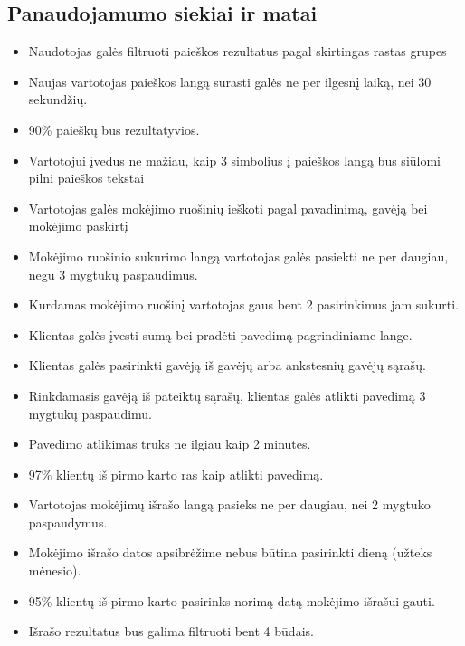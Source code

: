 \documentclass{VUMIFPSkursinis}
\begin{document}
\subsection{Panaudojamumo siekiai ir matai}
\begin{itemize}
	\item Naudotojas galės filtruoti paieškos rezultatus pagal skirtingas rastas grupes
	\item Naujas vartotojas paieškos langą surasti galės ne per ilgesnį laiką, nei 30 sekundžių.
	\item 90\% paieškų bus rezultatyvios.
	\item Vartotojui įvedus ne mažiau, kaip 3 simbolius į paieškos langą bus siūlomi pilni paieškos tekstai
	\item Vartotojas galės mokėjimo ruošinių ieškoti pagal pavadinimą, gavėją bei mokėjimo paskirtį
	\item Mokėjimo ruošinio sukurimo langą vartotojas galės pasiekti ne per daugiau, negu 3 mygtukų paspaudimus.
	\item Kurdamas mokėjimo ruošinį vartotojas gaus bent 2 pasirinkimus jam sukurti.
	\item Klientas galės įvesti sumą bei pradėti pavedimą pagrindiniame lange.
	\item Klientas galės pasirinkti gavėją iš gavėjų arba ankstesnių gavėjų sąrašų.
	\item Rinkdamasis gavėją iš pateiktų sąrašų, klientas galės atlikti pavedimą 3 mygtukų paspaudimu.
	\item Pavedimo atlikimas truks ne ilgiau kaip 2 minutes.
	\item 97\% klientų iš pirmo karto ras kaip atlikti pavedimą.
	\item Vartotojas mokėjimų išrašo langą pasieks ne per daugiau, nei 2 mygtuko paspaudymus.
	\item Mokėjimo išrašo datos apsibrėžime nebus būtina pasirinkti dieną (užteks mėnesio).
	\item 95\% klientų iš pirmo karto pasirinks norimą datą mokėjimo išrašui gauti.
	\item Išrašo rezultatus bus galima filtruoti bent 4 būdais.
\end{itemize}
\pagebreak
\end{document}
